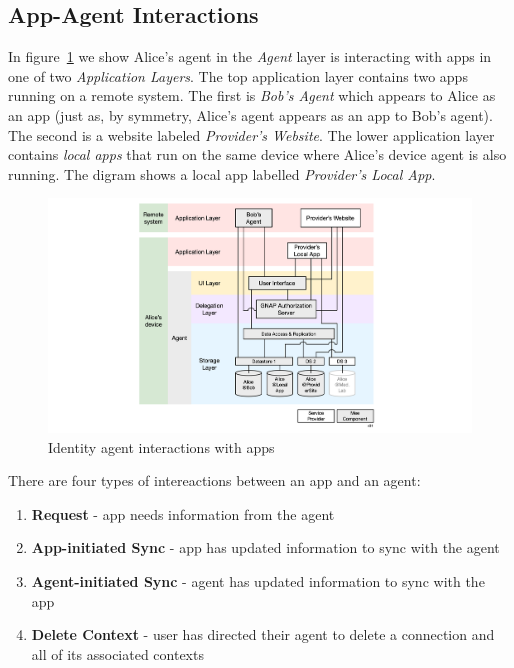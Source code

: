 \documentclass[11pt, oneside]{article}   	%
\begin{document}
\subsection{App-Agent Interactions}

In figure~\ref{fig:interactions} we show Alice's agent in the \emph{Agent} layer is interacting with apps in one of two \emph{Application Layers}. The top application layer contains two apps running on a remote system. The first is \emph{Bob's Agent} which appears to Alice as an app (just as, by symmetry, Alice's agent appears as an app to Bob's agent). The second is a website labeled \emph{Provider's Website}. The lower application layer contains \emph{local apps} that run on the same device where Alice's device agent is also running. The digram shows a local app labelled \emph{Provider's Local App}.

\begin{figure}[htbp]
\includegraphics[width=\textwidth]{./images/applications.png}
\caption{Identity agent interactions with apps}
\label{fig:interactions}
\end{figure}

There are four types of intereactions between an app and an agent:
\begin{enumerate}
	\item \textbf{Request} - app needs information from the agent
	\item \textbf{App-initiated Sync} - app has updated information to sync with the agent
	\item \textbf{Agent-initiated Sync} - agent has updated information to sync with the app
	\item \textbf{Delete Context} - user has directed their agent to delete a connection and all of its associated contexts
\end{enumerate}
\end{document}
